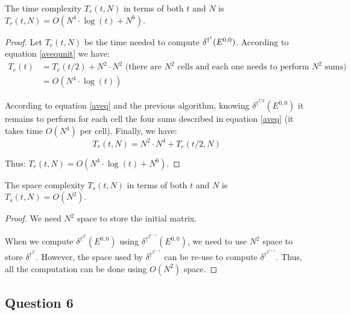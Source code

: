 \begin{prop}
 The time complexity $T_r(t,N)$ in terms of both $t$ and $N$ is $T_r(t,N) = O(N^4 \cdot \log(t) + N^6)$.
\end{prop}

\begin{proof}
  Let $T_e(t,N)$ be the time needed to compute $\delta^{\dag^t}(E^{0,0})$. According to equation \ref{avequnit} we have:
 \[\begin{split}
    T_e(t) & = T_e(t/2) + N^2 \cdot N^2 \text{ (there are } N^2 \text{ cells and each one needs to perform } N^2 \text{ sums)} \\
         & = O(N^4 \cdot \log(t))
   \end{split}
\]  
  
  According to equation \ref{aveq} and the previous algorithm, knowing $\delta^{\dag^{t/2}}(E^{0,0})$ it remains to perform for each cell the four sums described in equation \ref{aveq} (it takes time $O(N^4)$ per cell). Finally, we have:
  \[ T_r(t,N) = N^2 \cdot N^4 + T_e(t/2,N)\]
  
  Thus: $T_r(t,N) = O(N^4 \cdot \log(t) + N^6)$.
\end{proof}

\begin{prop}
 The space complexity $T_s(t,N)$ in terms of both $t$ and $N$ is $T_s(t,N) = O(N^2)$.
\end{prop}

\begin{proof}
 We need $N^2$ space to store the initial matrix.

 When we compute $\delta^{\dag^{2^i}}(E^{0,0})$ using $\delta^{\dag^{2^{i-1}}}(E^{0,0})$, we need to use $N^2$ space to store $\delta^{\dag^{2^i}}$. However, the space used by $\delta^{\dag^{2^{i-1}}}$ can be re-use to compute $\delta^{\dag^{2^{i+1}}}$. Thus, all the computation can be done using $O(N^2)$ space.
\end{proof}



\subsection*{Question 6}


